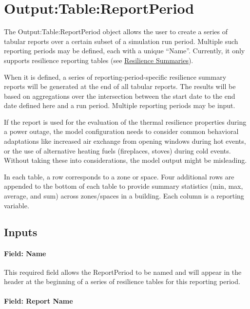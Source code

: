 \section{Output:Table:ReportPeriod}\label{outputtablereportperiod}

The Output:Table:ReportPeriod object allows the user to create a series of
tabular reports over a certain subset of a simulation run period. Multiple such
reporting periods may be defined, each with a unique ``Name''. Currently, it only
supports resilience reporting tables (see \hyperref[resilience-summaries]{Resilience Summaries}).

When it is defined, a series of reporting-period-specific resilience summary
reports will be generated at the end of all tabular reports. The results will be
based on aggregations over the intersection between the start date to the end
date defined here and a run period. Multiple reporting periods may be input.

If the report is used for the evaluation of the thermal resilience properties
during a power outage, the model configuration needs to consider common
behavioral adaptations like increased air exchange from opening windows during
hot events, or the use of alternative heating fuels (fireplaces, stoves) during
cold events. Without taking these into considerations, the model output might
be misleading.

In each table, a row corresponds to a zone or space. Four additional rows are
appended to the bottom of each table to provide summary statistics (min, max,
average, and sum) across zones/spaces in a building. Each column is a reporting
variable.

\subsection{Inputs}\label{inputs-074}

\paragraph{Field: Name}\label{field-name-066}

This required field allows the ReportPeriod to be named and will appear in the
header at the beginning of a series of resilience tables for this reporting
period.

\paragraph{Field: Report Name}\label{report-name-1}

